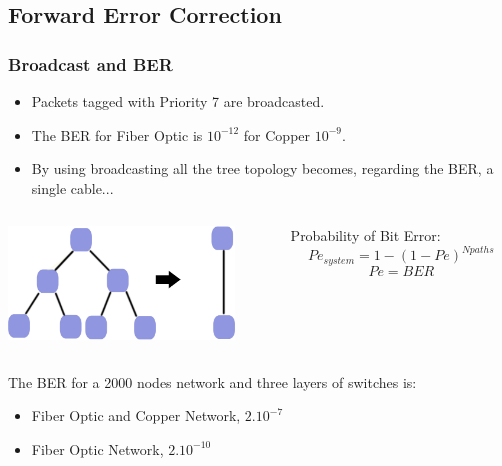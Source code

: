 \documentclass[]{beamer}
\begin{document}
\subsection{Forward Error Correction}
\begin{frame}
\frametitle{Broadcast and BER}
\begin{itemize}
\item Packets tagged with Priority 7 are broadcasted. 
\item The BER for Fiber Optic is $10^{-12}$ for Copper $10^{-9}$. 
\item By using broadcasting all the tree topology becomes, regarding the BER, a single cable...  
\end{itemize}

\begin{center}

\begin{columns}
  \begin{column}[c]{5cm}  %

	  \includegraphics[width=6cm,keepaspectratio]{../../figures/robustness/broadcast_ber.jpg}


  \end{column}

  \begin{column}[r]{5cm}  %
Probability of Bit Error:
	\begin{equation}
		Pe_{system} = 1 - (1 - Pe)^{N{paths}} \nonumber 
	\end{equation}	    
	\begin{equation}
		Pe = BER \nonumber
	\end{equation}  
  \end{column}
 
\end{columns}

\end{center}

The BER for a 2000 nodes network and three layers of switches is:
\begin{itemize}
	\item Fiber Optic and Copper  Network, $2.10^{-7}$
	\item Fiber Optic Network,  $2.10^{-10}$
\end{itemize}
\end{frame}
\end{document}
